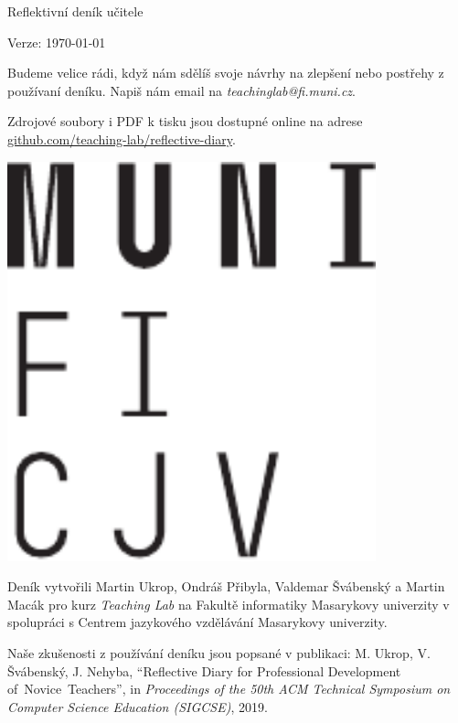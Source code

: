 \documentclass[twoside,openany]{book}
\begin{document}







\newpage
\vspace*{\fill}
Reflektivní deník učitele

Verze: \today

\bigskip
Budeme velice rádi, když nám sdělíš svoje návrhy na zlepšení nebo postřehy z používaní deníku. Napiš nám email na \textit{teachinglab@fi.muni.cz}.

Zdrojové soubory i PDF k tisku jsou dostupné online na adrese \url{github.com/teaching-lab/reflective-diary}.

\medskip
\begin{minipage}{0.28\textwidth}
	\includegraphics[width=0.80\textwidth]{../img/muni}\hfill
	\end{minipage}
\begin{minipage}{0.72\textwidth}
Deník vytvořili Martin Ukrop, Ondráš Přibyla, Valdemar Švábenský a Martin Macák pro kurz \textit{Teaching Lab} na Fakultě informatiky Masarykovy univerzity v spolupráci s Centrem jazykového vzdělávání Masarykovy univerzity.
\end{minipage}

\medskip
Naše zkušenosti z používání deníku jsou popsané v publikaci: M. Ukrop, V. Švábenský, J. Nehyba, \enquote{Reflective Diary for Professional Development of~Novice~Teachers}, in \textit{Proceedings of the 50th ACM Technical Symposium on Computer Science Education (SIGCSE)}, 2019.
\end{document}
